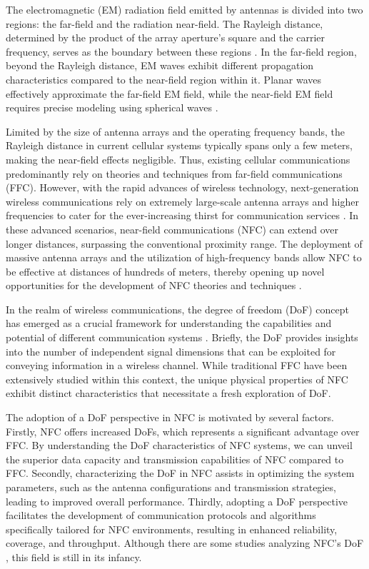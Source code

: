 \documentclass[journal]{IEEEtran}
\theoremstyle{definition}
\begin{document}
The electromagnetic (EM) radiation field emitted by antennas is divided into two regions: the far-field and the radiation near-field. The Rayleigh distance, determined by the product of the array aperture's square and the carrier frequency, serves as the boundary between these regions \cite{Liu2023}. In the far-field region, beyond the Rayleigh distance, EM waves exhibit different propagation characteristics compared to the near-field region within it. Planar waves effectively approximate the far-field EM field, while the near-field EM field requires precise modeling using spherical waves \cite{Liu2023}.


Limited by the size of antenna arrays and the operating frequency bands, the Rayleigh distance in current cellular systems typically spans only a few meters, making the near-field effects negligible. Thus, existing cellular communications predominantly rely on theories and techniques from far-field communications (FFC). However, with the rapid advances of wireless technology, next-generation wireless communications rely on extremely large-scale antenna arrays and higher frequencies to cater for the ever-increasing thirst for communication services \cite{Cui2023}. In these advanced scenarios, near-field communications (NFC) can extend over longer distances, surpassing the conventional proximity range. The deployment of massive antenna arrays and the utilization of high-frequency bands allow NFC to be effective at distances of hundreds of meters, thereby opening up novel opportunities for the development of NFC theories and techniques \cite{Liu2023,Cui2023}.

In the realm of wireless communications, the degree of freedom (DoF) concept has emerged as a crucial framework for understanding the capabilities and potential of different communication systems \cite{Tse2005}. Briefly, the DoF provides insights into the number of independent signal dimensions that can be exploited for conveying information in a wireless channel. While traditional FFC have been extensively studied within this context, the unique physical properties of NFC exhibit distinct characteristics that necessitate a fresh exploration of DoF.

The adoption of a DoF perspective in NFC is motivated by several factors. Firstly, NFC offers increased DoFs, which represents a significant advantage over FFC. By understanding the DoF characteristics of NFC systems, we can unveil the superior data capacity and transmission capabilities of NFC compared to FFC. Secondly, characterizing the DoF in NFC assists in optimizing the system parameters, such as the antenna configurations and transmission strategies, leading to improved overall performance. Thirdly, adopting a DoF perspective facilitates the development of communication protocols and algorithms specifically tailored for NFC environments, resulting in enhanced reliability, coverage, and throughput. Although there are some studies analyzing NFC's DoF \cite{Liu2023}, this field is still in its infancy.
\end{document}
